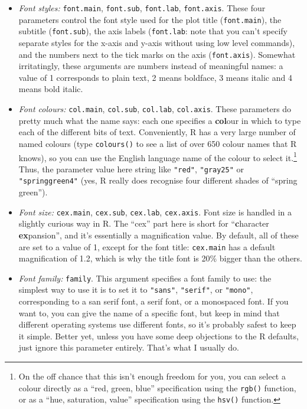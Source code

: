 \documentclass[
]{book}
\providecommand{\tightlist}{%
  \setlength{\itemsep}{0pt}\setlength{\parskip}{0pt}}
\begin{document}
\begin{itemize}
\tightlist
\item
  \emph{Font styles:} \texttt{font.main}, \texttt{font.sub}, \texttt{font.lab}, \texttt{font.axis}. These four parameters control the font style used for the plot title (\texttt{font.main}), the subtitle (\texttt{font.sub}), the axis labels (\texttt{font.lab}: note that you can't specify separate styles for the x-axis and y-axis without using low level commands), and the numbers next to the tick marks on the axis (\texttt{font.axis}). Somewhat irritatingly, these arguments are numbers instead of meaningful names: a value of 1 corresponds to plain text, 2 means boldface, 3 means italic and 4 means bold italic.
\item
  \emph{Font colours:} \texttt{col.main}, \texttt{col.sub}, \texttt{col.lab}, \texttt{col.axis}. These parameters do pretty much what the name says: each one specifies a \textbf{col}our in which to type each of the different bits of text. Conveniently, R has a very large number of named colours (type \texttt{colours()} to see a list of over 650 colour names that R knows), so you can use the English language name of the colour to select it.\footnote{On the off chance that this isn't enough freedom for you, you can select a colour directly as a ``red, green, blue'' specification using the \texttt{rgb()} function, or as a ``hue, saturation, value'' specification using the \texttt{hsv()} function.} Thus, the parameter value here string like \texttt{"red"}, \texttt{"gray25"} or \texttt{"springgreen4"} (yes, R really does recognise four different shades of ``spring green'').
\item
  \emph{Font size:} \texttt{cex.main}, \texttt{cex.sub}, \texttt{cex.lab}, \texttt{cex.axis}. Font size is handled in a slightly curious way in R. The ``cex'' part here is short for ``\textbf{c}haracter \textbf{ex}pansion'', and it's essentially a magnification value. By default, all of these are set to a value of 1, except for the font title: \texttt{cex.main} has a default magnification of 1.2, which is why the title font is 20\% bigger than the others.
\item
  \emph{Font family:} \texttt{family}. This argument specifies a font family to use: the simplest way to use it is to set it to \texttt{"sans"}, \texttt{"serif"}, or \texttt{"mono"}, corresponding to a san serif font, a serif font, or a monospaced font. If you want to, you can give the name of a specific font, but keep in mind that different operating systems use different fonts, so it's probably safest to keep it simple. Better yet, unless you have some deep objections to the R defaults, just ignore this parameter entirely. That's what I usually do.
\end{itemize}
\end{document}
